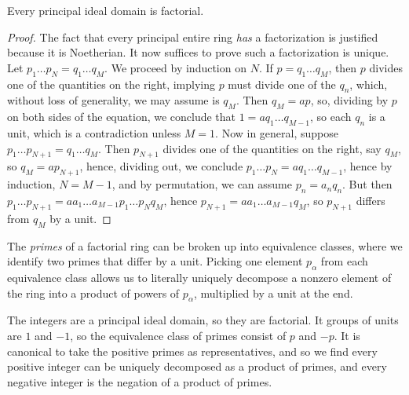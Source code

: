 \begin{theorem}
    Every principal ideal domain is factorial.
\end{theorem}
\begin{proof}
    The fact that every principal entire ring {\it has} a factorization is justified because it is Noetherian. It now suffices to prove such a factorization is unique. Let $p_1 \dots p_N = q_1 \dots q_M$. We proceed by induction on $N$. If $p = q_1 \dots q_M$, then $p$ divides one of the quantities on the right, implying $p$ must divide one of the $q_n$, which, without loss of generality, we may assume is $q_M$. Then $q_M = ap$, so, dividing by $p$ on both sides of the equation, we conclude that $1 = a q_1 \dots q_{M-1}$, so each $q_n$ is a unit, which is a contradiction unless $M = 1$. Now in general, suppose $p_1 \dots p_{N+1} = q_1 \dots q_M$. Then $p_{N+1}$ divides one of the quantities on the right, say $q_M$, so $q_M = ap_{N+1}$, hence, dividing out, we conclude $p_1 \dots p_N = a q_1 \dots q_{M-1}$, hence by induction, $N = M-1$, and by permutation, we can assume $p_n = a_nq_n$. But then $p_1 \dots p_{N+1} = aa_1 \dots a_{M-1} p_1 \dots p_N q_M$, hence $p_{N+1} = aa_1 \dots a_{M-1} q_M$, so $p_{N+1}$ differs from $q_M$ by a unit.
\end{proof}

The {\it primes} of a factorial ring can be broken up into equivalence classes, where we identify two primes that differ by a unit. Picking one element $p_\alpha$ from each equivalence class allows us to literally uniquely decompose a nonzero element of the ring into a product of powers of $p_\alpha$, multiplied by a unit at the end.

\begin{example}
    The integers are a principal ideal domain, so they are factorial. It groups of units are $1$ and $-1$, so the equivalence class of primes consist of $p$ and $-p$. It is canonical to take the positive primes as representatives, and so we find every positive integer can be uniquely decomposed as a product of primes, and every negative integer is the negation of a product of primes.
\end{example}




